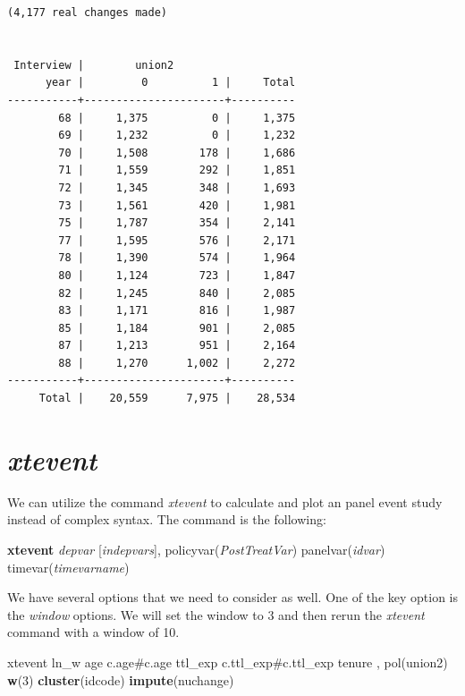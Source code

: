 \documentclass[
]{book}
\newenvironment{Shaded}{\begin{snugshade}}{\end{snugshade}}
\newcommand{\FunctionTok}[1]{\textcolor[rgb]{0.13,0.29,0.53}{\textbf{#1}}}
\newcommand{\KeywordTok}[1]{\textcolor[rgb]{0.13,0.29,0.53}{\textbf{#1}}}
\newcommand{\NormalTok}[1]{#1}
\begin{document}
\begin{verbatim}
(4,177 real changes made)


 Interview |        union2
      year |         0          1 |     Total
-----------+----------------------+----------
        68 |     1,375          0 |     1,375 
        69 |     1,232          0 |     1,232 
        70 |     1,508        178 |     1,686 
        71 |     1,559        292 |     1,851 
        72 |     1,345        348 |     1,693 
        73 |     1,561        420 |     1,981 
        75 |     1,787        354 |     2,141 
        77 |     1,595        576 |     2,171 
        78 |     1,390        574 |     1,964 
        80 |     1,124        723 |     1,847 
        82 |     1,245        840 |     2,085 
        83 |     1,171        816 |     1,987 
        85 |     1,184        901 |     2,085 
        87 |     1,213        951 |     2,164 
        88 |     1,270      1,002 |     2,272 
-----------+----------------------+----------
     Total |    20,559      7,975 |    28,534 
\end{verbatim}

\section{\texorpdfstring{\emph{xtevent}}{xtevent}}\label{xtevent}

We can utilize the command \emph{xtevent} to calculate and plot an panel event study instead of complex syntax. The command is the following:

\textbf{xtevent} \emph{depvar} {[}\emph{indepvars}{]}, policyvar(\emph{PostTreatVar}) panelvar(\emph{idvar}) timevar(\emph{timevarname})

We have several options that we need to consider as well. One of the key option is the \emph{window} options. We will set the window to 3 and then rerun the \emph{xtevent} command with a window of 10.

\begin{Shaded}
\begin{Highlighting}[]
\NormalTok{xtevent ln\_w age c.age\#c.age ttl\_exp c.ttl\_exp\#c.ttl\_exp tenure , pol(union2) }\FunctionTok{w}\NormalTok{(3) }\KeywordTok{cluster}\NormalTok{(idcode) }\KeywordTok{impute}\NormalTok{(nuchange)}
\end{Highlighting}
\end{Shaded}
\end{document}
